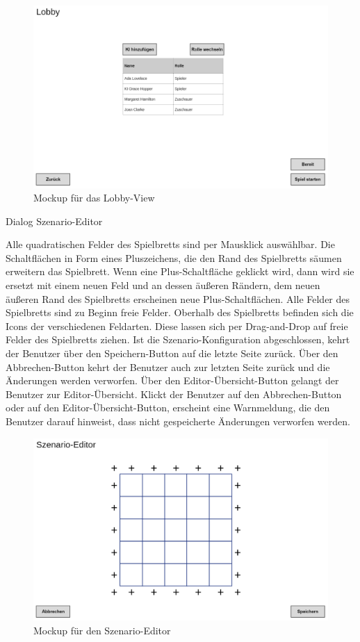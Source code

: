 \begin{figure}
  \centering
  \includegraphics[width=\textwidth]{Meilenstein03/Lobby_Mockup.png}
  \caption{Mockup für das Lobby-View}
\end{figure}

Dialog \glqq{}Szenario-Editor\grqq{}

Alle quadratischen Felder des Spielbretts sind per Mausklick auswählbar. Die Schaltflächen in Form eines Pluszeichens, die den Rand des Spielbretts säumen erweitern das Spielbrett. Wenn eine Plus-Schaltfläche geklickt wird, dann wird sie ersetzt mit einem neuen Feld und an dessen äußeren Rändern, dem neuen äußeren Rand des Spielbretts erscheinen neue Plus-Schaltflächen. Alle Felder des Spielbretts sind zu Beginn freie Felder. Oberhalb des Spielbretts befinden sich die Icons der verschiedenen Feldarten. Diese lassen sich per Drag-and-Drop auf freie Felder des Spielbretts ziehen. Ist die Szenario-Konfiguration abgeschlossen, kehrt der Benutzer über den Speichern-Button auf die letzte Seite zurück. Über den Abbrechen-Button kehrt der Benutzer auch zur letzten Seite zurück und die Änderungen werden verworfen. Über den Editor-Übersicht-Button gelangt der Benutzer zur Editor-Übersicht. Klickt der Benutzer auf den Abbrechen-Button oder auf den Editor-Übersicht-Button, erscheint eine Warnmeldung, die den Benutzer darauf hinweist, dass nicht gespeicherte Änderungen verworfen werden.

\begin{figure}
  \centering
  \includegraphics[width=\textwidth]{Meilenstein03/Szenario-Editor_Mockup.png}
  \caption{Mockup für den Szenario-Editor}
\end{figure}

